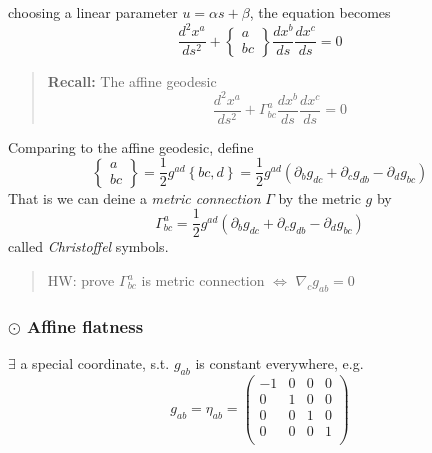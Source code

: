 choosing a linear parameter $u=\alpha s + \beta$, the equation becomes 
\begin{equation}
\frac{d^2x^a}{ds^2} + \left\{\begin{matrix}a\\bc\end{matrix}\right\} \frac{dx^{b}}{ds}\frac{dx^{c}}{ds} = 0
\end{equation}


\begin{quote}
	\textbf{Recall:}
The affine geodesic
\begin{equation}
\frac{d^2x^a}{ds^2} + \Gamma^{a}_{bc} \frac{dx^{b}}{ds}\frac{dx^{c}}{ds} = 0
\end{equation}


\end{quote}

Comparing to the affine geodesic, define
\begin{equation}
\left\{\begin{matrix}a\\bc\end{matrix}\right\} = \frac{1}{2}g^{ad}\left\{bc,d\right\}
= \frac{1}{2}g^{ad} \left(\partial_{b}g_{dc} + \partial_{c}g_{db} -\partial_{d}g_{bc}\right)
\end{equation}
That is we can deine a \textit{metric connection} $\Gamma$ by the metric $g$ by
\begin{equation}
\Gamma^{a}_{bc} = \frac{1}{2}g^{ad} \left(\partial_{b}g_{dc} + \partial_{c}g_{db} -\partial_{d}g_{bc}\right)
\end{equation}
called \textit{Christoffel} symbols.

\begin{quote}
	HW: prove $\Gamma^{a}_{bc}$ is metric connection $\Leftrightarrow$ $\nabla_{c}g_{ab} = 0$
\end{quote}

\subsubsection{$\odot$ Affine flatness} %


$\exists$ a special coordinate, s.t. $g_{ab}$ is constant everywhere, e.g.
\begin{equation}
g_{ab} = \eta_{ab}
= \begin{pmatrix}
-1 & 0 & 0 & 0\\
0 & 1 & 0 & 0\\
0 & 0 & 1 & 0\\
0 & 0 & 0 & 1\\
\end{pmatrix}
\end{equation}


